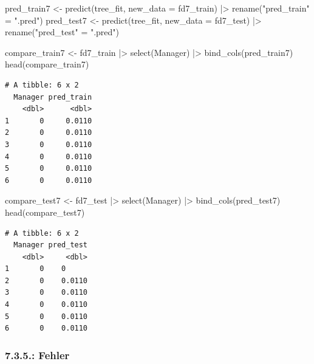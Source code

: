 \documentclass[
  letterpaper,
  DIV=11,
  numbers=noendperiod]{scrartcl}
\newenvironment{Shaded}{\begin{snugshade}}{\end{snugshade}}
\newcommand{\AttributeTok}[1]{\textcolor[rgb]{0.40,0.45,0.13}{#1}}
\newcommand{\FunctionTok}[1]{\textcolor[rgb]{0.28,0.35,0.67}{#1}}
\newcommand{\NormalTok}[1]{\textcolor[rgb]{0.00,0.23,0.31}{#1}}
\newcommand{\OtherTok}[1]{\textcolor[rgb]{0.00,0.23,0.31}{#1}}
\newcommand{\SpecialCharTok}[1]{\textcolor[rgb]{0.37,0.37,0.37}{#1}}
\newcommand{\StringTok}[1]{\textcolor[rgb]{0.13,0.47,0.30}{#1}}
\begin{document}
\begin{Shaded}
\begin{Highlighting}[]
\NormalTok{pred\_train7 }\OtherTok{\textless{}{-}} \FunctionTok{predict}\NormalTok{(tree\_fit, }\AttributeTok{new\_data =}\NormalTok{ fd7\_train) }\SpecialCharTok{|\textgreater{}} \FunctionTok{rename}\NormalTok{(}\StringTok{"pred\_train"} \OtherTok{=} \StringTok{".pred"}\NormalTok{)}
\NormalTok{pred\_test7 }\OtherTok{\textless{}{-}} \FunctionTok{predict}\NormalTok{(tree\_fit, }\AttributeTok{new\_data =}\NormalTok{ fd7\_test) }\SpecialCharTok{|\textgreater{}}  \FunctionTok{rename}\NormalTok{(}\StringTok{"pred\_test"} \OtherTok{=} \StringTok{".pred"}\NormalTok{)}

\NormalTok{compare\_train7 }\OtherTok{\textless{}{-}}\NormalTok{ fd7\_train }\SpecialCharTok{|\textgreater{}} 
  \FunctionTok{select}\NormalTok{(Manager) }\SpecialCharTok{|\textgreater{}} 
  \FunctionTok{bind\_cols}\NormalTok{(pred\_train7)}
\FunctionTok{head}\NormalTok{(compare\_train7)}
\end{Highlighting}
\end{Shaded}

\begin{verbatim}
# A tibble: 6 x 2
  Manager pred_train
    <dbl>      <dbl>
1       0     0.0110
2       0     0.0110
3       0     0.0110
4       0     0.0110
5       0     0.0110
6       0     0.0110
\end{verbatim}

\begin{Shaded}
\begin{Highlighting}[]
\NormalTok{compare\_test7 }\OtherTok{\textless{}{-}}\NormalTok{ fd7\_test }\SpecialCharTok{|\textgreater{}} 
  \FunctionTok{select}\NormalTok{(Manager) }\SpecialCharTok{|\textgreater{}} 
  \FunctionTok{bind\_cols}\NormalTok{(pred\_test7)}
\FunctionTok{head}\NormalTok{(compare\_test7)}
\end{Highlighting}
\end{Shaded}

\begin{verbatim}
# A tibble: 6 x 2
  Manager pred_test
    <dbl>     <dbl>
1       0    0     
2       0    0.0110
3       0    0.0110
4       0    0.0110
5       0    0.0110
6       0    0.0110
\end{verbatim}

\hypertarget{fehler-2}{%
\subsubsection{7.3.5.: Fehler}\label{fehler-2}}
\end{document}
